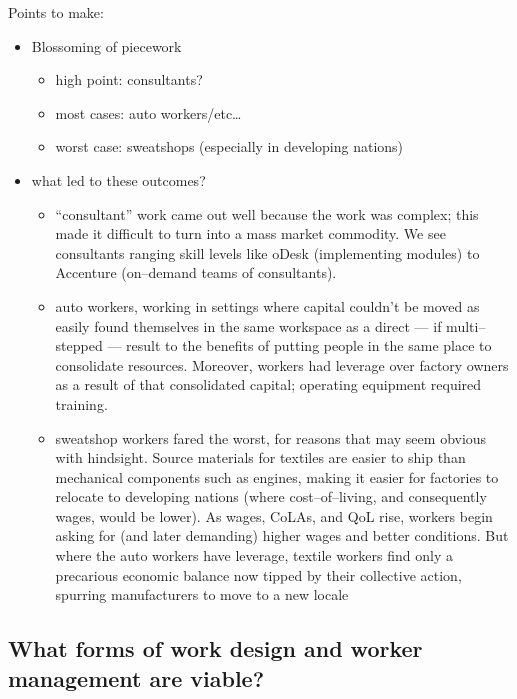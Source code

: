 \documentclass[trackingWork]{subfiles}
\begin{document}
Points to make:
  \begin{itemize}
    \item Blossoming of piecework
    \begin{itemize}
      \item high point: consultants?
      \item most cases: auto workers/etc\dots
      \item worst case: sweatshops (especially in developing nations)
    \end{itemize}
    \item what led to these outcomes?
    \begin{itemize}
      \item ``consultant'' work came out well because the work was complex;
      this made it difficult to turn into a mass market commodity.
      We see consultants ranging skill levels like
      oDesk (implementing modules) to
      Accenture (on--demand teams of consultants).
      \item auto workers,
      working in settings where capital couldn't be moved as easily
      found themselves in the same workspace as a direct
      --- if multi--stepped ---
      result to the benefits of putting people in the same place to consolidate resources.
      Moreover,
      workers had leverage over factory owners as a result of that consolidated capital;
      operating equipment required training.
      \item sweatshop workers fared the worst,
      for reasons that may seem obvious with hindsight.
      Source materials for textiles are easier to ship than mechanical components such as engines,
      making it easier for factories to relocate to developing nations
      (where cost--of--living, and consequently wages, would be lower).
      As wages, CoLAs, and QoL rise, workers begin asking for
      (and later demanding)
      higher wages and better conditions.
      But where the auto workers have leverage,
      textile workers find only a precarious economic balance now tipped by their collective action,
      spurring manufacturers to move to a new locale
    \end{itemize}
  \end{itemize}





\subsection{What forms of work design and worker management are viable?}
\end{document}
